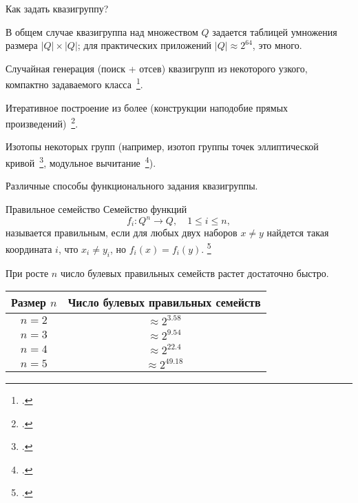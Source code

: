 \begin{frame}{Как задать квазигруппу?}
    \begin{coloritemize}
        \item В общем случае квазигруппа над множеством $Q$ задается таблицей умножения размера $\lvert Q \rvert \times \lvert Q \rvert$; для практических приложений $\lvert Q \rvert \approx 2^{64}$, это много.
        \pause 
        \item Случайная генерация (поиск + отсев) квазигрупп из некоторого узкого, компактно задаваемого класса~\footcite{gligoroski2008public, chen2010multivariate}.
        \pause 
        \item Итеративное построение из более  (конструкции наподобие прямых произведений)~\footcite{gribovphd, EdonRprime}.
        \pause 
        \item Изотопы некоторых  групп (например, изотоп группы точек эллиптической кривой~\footcite{DH16}, модульное вычитание~\footcite{snavsel2009hash}).
        \pause 
        \item Различные способы функционального задания квазигруппы.
    \end{coloritemize}
\end{frame}


\begin{frame}
    \begin{myexample}{Правильное семейство}
        Семейство функций 
        \[
            f_i \colon Q^n \to Q, \quad 1 \le i \le n,
        \]
        называется правильным, если для любых двух наборов $x \ne y$ найдется такая координата $i$, что $x_i \ne y_i$, но $f_i(x) = f_i(y)$.
        \footcitetext{nosov98, nosov99,nosov06abel,galatenko2020latin}
    \end{myexample}
    \pause 

    При росте $n$ число булевых правильных семейств растет достаточно быстро.
    \begin{center}
        \tiny{
            \begin{tabular}{|c|c|}
                \hline
                \rowcolor{Gray}
                Размер $n$ & Число булевых правильных семейств \\
                \hline
                $n = 2$ & $\approx 2^{3.58}$ \\
                \hline
                $n = 3$ & $\approx 2^{9.54}$ \\
                \hline
                $n = 4$ & $\approx 2^{22.4}$ \\
                \hline
                $n = 5$ & $\approx 2^{49.18}$ \\
                \hline
            \end{tabular}
        }
    \end{center}
\end{frame}


